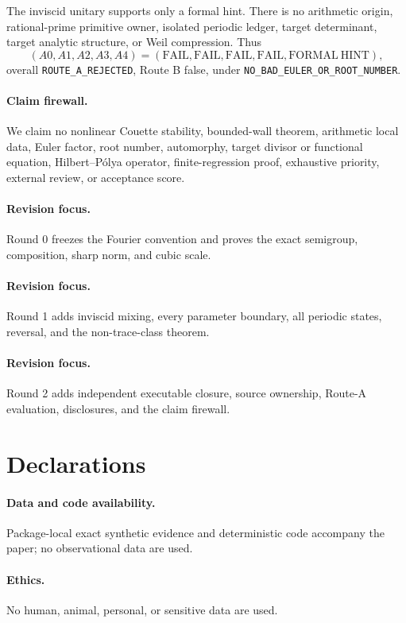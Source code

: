\documentclass[9pt]{extarticle}
\begin{document}
The inviscid unitary supports only a formal hint.  There is no arithmetic
origin, rational-prime primitive owner, isolated periodic ledger, target
determinant, target analytic structure, or Weil compression.  Thus
\[
 (A0,A1,A2,A3,A4)=(\mathrm{FAIL},\mathrm{FAIL},\mathrm{FAIL},
 \mathrm{FAIL},\mathrm{FORMAL\ HINT}),
\]
overall \texttt{ROUTE\_A\_REJECTED}, Route B false, under
\texttt{NO\_BAD\_EULER\_OR\_ROOT\_NUMBER}.

\paragraph{Claim firewall.}
We claim no nonlinear Couette stability, bounded-wall theorem, arithmetic
local data, Euler factor, root number, automorphy, target divisor or functional
equation, Hilbert--P\'olya operator, finite-regression proof, exhaustive
priority, external review, or acceptance score.
\fi

\ifcase\CRevisionRound
\paragraph{Revision focus.} Round 0 freezes the Fourier convention and proves
the exact semigroup, composition, sharp norm, and cubic scale.
\or
\paragraph{Revision focus.} Round 1 adds inviscid mixing, every parameter
boundary, all periodic states, reversal, and the non-trace-class theorem.
\or
\paragraph{Revision focus.} Round 2 adds independent executable closure,
source ownership, Route-A evaluation, disclosures, and the claim firewall.
\fi

\section*{Declarations}
\paragraph{Data and code availability.} Package-local exact synthetic evidence
and deterministic code accompany the paper; no observational data are used.
\paragraph{Ethics.} No human, animal, personal, or sensitive data are used.
\end{document}
